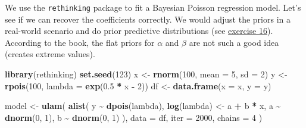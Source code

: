 \documentclass[
]{book}
\newenvironment{Shaded}{\begin{snugshade}}{\end{snugshade}}
\newcommand{\AttributeTok}[1]{\textcolor[rgb]{0.13,0.29,0.53}{#1}}
\newcommand{\DecValTok}[1]{\textcolor[rgb]{0.00,0.00,0.81}{#1}}
\newcommand{\FloatTok}[1]{\textcolor[rgb]{0.00,0.00,0.81}{#1}}
\newcommand{\FunctionTok}[1]{\textcolor[rgb]{0.13,0.29,0.53}{\textbf{#1}}}
\newcommand{\NormalTok}[1]{#1}
\newcommand{\OtherTok}[1]{\textcolor[rgb]{0.56,0.35,0.01}{#1}}
\newcommand{\SpecialCharTok}[1]{\textcolor[rgb]{0.81,0.36,0.00}{\textbf{#1}}}
\begin{document}
We use the \texttt{rethinking} package to fit a Bayesian Poisson regression model.
Let's see if we can recover the coefficients correctly.
We would adjust the priors in a real-world scenario and do
prior predictive distributions (see \hyperref[exercise16_LMM]{exercise 16}). According to the book, the flat priors for \(\alpha\) and \(\beta\)
are not such a good idea (creates extreme values).

\begin{Shaded}
\begin{Highlighting}[]
\FunctionTok{library}\NormalTok{(rethinking)}
\FunctionTok{set.seed}\NormalTok{(}\DecValTok{123}\NormalTok{)}
\NormalTok{x }\OtherTok{\textless{}{-}} \FunctionTok{rnorm}\NormalTok{(}\DecValTok{100}\NormalTok{, }\AttributeTok{mean =} \DecValTok{5}\NormalTok{, }\AttributeTok{sd =} \DecValTok{2}\NormalTok{)}
\NormalTok{y }\OtherTok{\textless{}{-}} \FunctionTok{rpois}\NormalTok{(}\DecValTok{100}\NormalTok{, }\AttributeTok{lambda =} \FunctionTok{exp}\NormalTok{(}\FloatTok{0.5} \SpecialCharTok{*}\NormalTok{ x }\SpecialCharTok{{-}} \DecValTok{2}\NormalTok{))}
\NormalTok{df }\OtherTok{\textless{}{-}} \FunctionTok{data.frame}\NormalTok{(}\AttributeTok{x =}\NormalTok{ x, }\AttributeTok{y =}\NormalTok{ y)}

\NormalTok{model }\OtherTok{\textless{}{-}} \FunctionTok{ulam}\NormalTok{(}
  \FunctionTok{alist}\NormalTok{(}
\NormalTok{    y }\SpecialCharTok{\textasciitilde{}} \FunctionTok{dpois}\NormalTok{(lambda),}
    \FunctionTok{log}\NormalTok{(lambda) }\OtherTok{\textless{}{-}}\NormalTok{ a }\SpecialCharTok{+}\NormalTok{ b }\SpecialCharTok{*}\NormalTok{ x,}
\NormalTok{    a }\SpecialCharTok{\textasciitilde{}} \FunctionTok{dnorm}\NormalTok{(}\DecValTok{0}\NormalTok{, }\DecValTok{1}\NormalTok{),}
\NormalTok{    b }\SpecialCharTok{\textasciitilde{}} \FunctionTok{dnorm}\NormalTok{(}\DecValTok{0}\NormalTok{, }\DecValTok{1}\NormalTok{)}
\NormalTok{  ),}
  \AttributeTok{data =}\NormalTok{ df,}
  \AttributeTok{iter =} \DecValTok{2000}\NormalTok{,}
  \AttributeTok{chains =} \DecValTok{4}
\NormalTok{)}
\end{Highlighting}
\end{Shaded}
\end{document}

